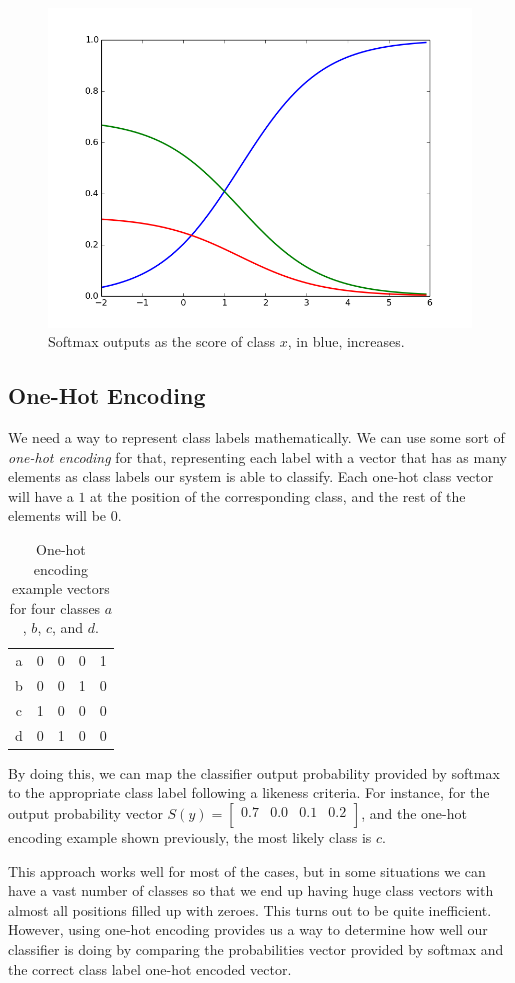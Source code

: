 \documentclass[english, 11pt]{article}
\begin{document}
	\begin{figure}[!hbt]
		\centering
		\includegraphics[width=0.5\linewidth]{l1/figures/softmax_output}
		\caption{Softmax outputs as the score of class $x$, in blue, increases.}
		\label{fig:softmax}
	\end{figure}

	\subsection{One-Hot Encoding}

	We need a way to represent class labels mathematically. We can use some sort of \emph{one-hot encoding} for that, representing each label with a vector that has as many elements as class labels our system is able to classify. Each one-hot class vector will have a $1$ at the position of the corresponding class, and the rest of the elements will be $0$.

	\begin{table}[!hbt]
		\centering
		\begin{tabular}{c|cccc}
			a & 0 & 0 & 0 & 1\\
			b & 0 & 0 & 1 & 0\\
			c & 1 & 0 & 0 & 0\\
			d & 0 & 1 & 0 & 0\\
		\end{tabular}
		\caption{One-hot encoding example vectors for four classes $a$, $b$, $c$, and $d$.}
	\end{table}

By doing this, we can map the classifier output probability provided by softmax to the appropriate class label following a likeness criteria. For instance, for the output probability vector $S(y)=\begin{bmatrix} 0.7 & 0.0 & 0.1 & 0.2\\ \end{bmatrix}$, and the one-hot encoding example shown previously, the most likely class is $c$.

	This approach works well for most of the cases, but in some situations we can have a vast number of classes so that we end up having huge class vectors with almost all positions filled up with zeroes. This turns out to be quite inefficient. However, using one-hot encoding provides us a way to determine how well our classifier is doing by comparing the probabilities vector provided by softmax and the correct class label one-hot encoded vector.
\end{document}

